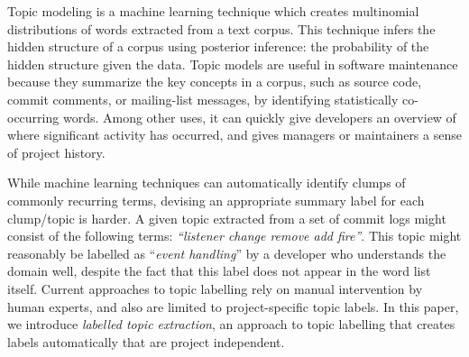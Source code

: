 \documentclass[smallextended]{svjour3}       %
\begin{document}
Topic modeling is a machine learning technique which creates
multinomial distributions of words extracted from a text corpus. 
This technique infers the hidden structure of a corpus using posterior
inference: the probability of the hidden structure given the data. 
Topic models are useful in software maintenance because they summarize
the key concepts in a corpus, such as source code, commit comments, or
mailing-list messages, by identifying statistically co-occurring words. 
Among other uses, it can quickly give developers an overview of where significant
activity has occurred, and gives managers or maintainers a sense of
project history. 

While machine learning techniques can automatically identify clumps of
commonly recurring terms, devising an appropriate summary label for
each clump/topic is harder.  
A given topic extracted from a set of commit logs might consist of the following terms: \emph{ ``listener change remove add fire''}. 
This topic might reasonably be labelled as
``\emph{event handling}'' by a developer who understands the domain well,
despite the fact that this label does not appear in the word list itself.  
Current approaches to topic labelling rely on manual intervention by
human experts, and also are limited to project-specific topic labels.  
In this paper, we introduce \emph{labelled topic extraction}, an
approach to topic labelling that creates labels automatically that are
project independent.


\end{document}
